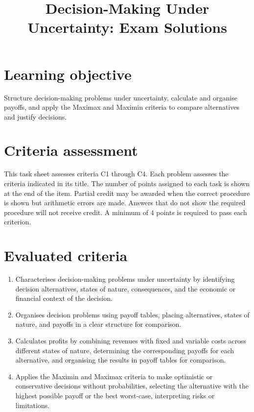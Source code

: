 \makeatletter
{}
\makeatother



\title{Decision-Making Under Uncertainty: Exam Solutions}
\author{}
\date{}


	\maketitle
	\vspace{-2cm}
	\setcounter{tocdepth}{1}
	\setcounter{secnumdepth}{2}
	\label{toc}
	\tableofcontents
	
	\vspace{-5mm}
	\section*{Learning objective}\vspace{-5mm}
	Structure decision-making problems under uncertainty, calculate and organise payoffs, and apply the Maximax and Maximin criteria to compare alternatives and justify decisions.
	
	\section*{Criteria assessment}\vspace{-5mm}
	This task sheet assesses criteria C1 through C4. Each problem assesses the criteria indicated in its title. The number of points assigned to each task is shown at the end of the item. Partial credit may be awarded when the correct procedure is shown but arithmetic errors are made. Answers that do not show the required procedure will not receive credit. A minimum of 4 points is required to pass each criterion.
	
	\section*{Evaluated criteria}
	\begin{enumerate}[label=\textbf{C\arabic*}]
		\item Characterises decision-making problems under uncertainty by identifying decision alternatives, states of nature, consequences, and the economic or financial context of the decision.
		\item Organises decision problems using payoff tables, placing alternatives, states of nature, and payoffs in a clear structure for comparison.
		\item Calculates profits by combining revenues with fixed and variable costs across different states of nature, determining the corresponding payoffs for each alternative, and organising the results in payoff tables for comparison.
		\item Applies the Maximin and Maximax criteria to make optimistic or conservative decisions without probabilities, selecting the alternative with the highest possible payoff or the best worst-case, interpreting risks or limitations.
	\end{enumerate}
	
